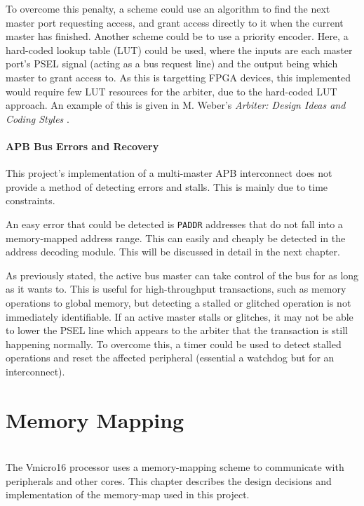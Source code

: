 To overcome this penalty, a scheme could use an algorithm to find the next master port requesting access, and grant access directly to it when the current master has finished. Another scheme could be to use a priority encoder. Here, a hard-coded lookup table (LUT) could be used, where the inputs are each master port's PSEL signal (acting as a bus request line) and the output being which master to grant access to. As this is targetting FPGA devices, this implemented would require few LUT resources for the arbiter, due to the hard-coded LUT approach. An example of this is given in M. Weber's \textit{Arbiter: Design Ideas and Coding Styles} \cite[p.~2]{weber2001arbiters}.

\subsubsection*{APB Bus Errors and Recovery}
This project's implementation of a multi-master APB interconnect does not provide a method of detecting errors and stalls. This is mainly due to time constraints.

An easy error that could be detected is \verb|PADDR| addresses that do not fall into a memory-mapped address range. This can easily and cheaply be detected in the address decoding module. This will be discussed in detail in the next chapter.

As previously stated, the active bus master can take control of the bus for as long as it wants to. This is useful for high-throughput transactions, such as memory operations to global memory, but detecting a stalled or glitched operation is not immediately identifiable. If an active master stalls or glitches, it may not be able to lower the PSEL line which appears to the arbiter that the transaction is still happening normally. To overcome this, a timer could be used to detect stalled operations and reset the affected peripheral (essential a watchdog but for an interconnect). 

\chapter{Memory Mapping}
{%
\startcontents[chapters]
}
\noindent\\
The Vmicro16 processor uses a memory-mapping scheme to communicate with peripherals and other cores. This chapter describes the design decisions and implementation of the memory-map used in this project.

